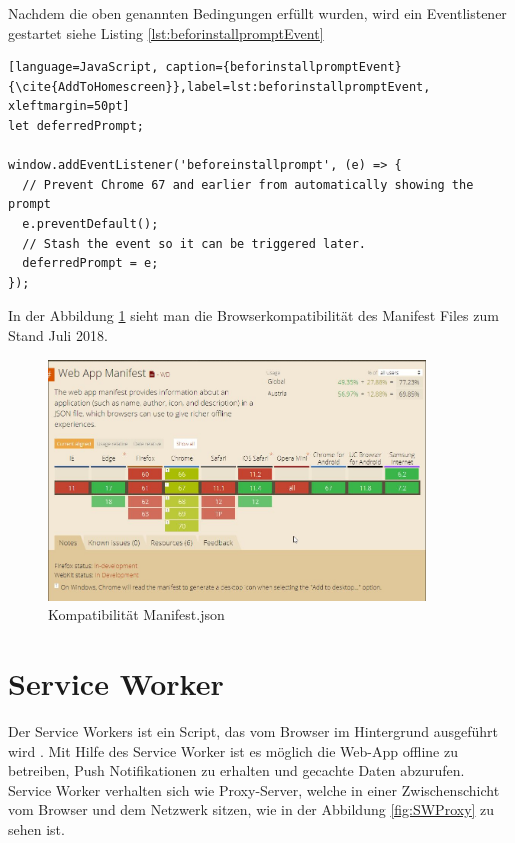 Nachdem die oben genannten Bedingungen erfüllt wurden, wird ein Eventlistener gestartet siehe Listing \ref{lst:beforinstallpromptEvent}


\begin{lstlisting}[language=JavaScript, caption={beforinstallpromptEvent} {\cite{AddToHomescreen}},label=lst:beforinstallpromptEvent, xleftmargin=50pt]
let deferredPrompt;

window.addEventListener('beforeinstallprompt', (e) => {
  // Prevent Chrome 67 and earlier from automatically showing the prompt
  e.preventDefault();
  // Stash the event so it can be triggered later.
  deferredPrompt = e;
});
\end{lstlisting}

In der Abbildung \ref{fig:BrowserManifest} sieht man die Browserkompatibilität des Manifest Files zum Stand Juli 2018.
 
\begin{figure}[H]
	\centering
	\includegraphics[width=10cm]{BilderAllgemein/BrowserManifest}\medskip
	\caption{Kompatibilität Manifest.json \cite{BrowserSupport}}
	\label{fig:BrowserManifest}
\end{figure}
 


\section{Service Worker}\label{sub:ServiceWorker}
Der Service Workers ist ein Script, das vom Browser im Hintergrund ausgeführt wird \cite{ServiceWorkerRegistration}. Mit Hilfe des Service Worker ist es möglich die \acs{Web-App} offline zu betreiben, Push Notifikationen zu erhalten und gecachte Daten abzurufen. Service Worker verhalten sich wie Proxy-Server, welche in einer Zwischenschicht vom Browser und dem Netzwerk sitzen, wie in der Abbildung \ref{fig:SWProxy} zu sehen ist.

